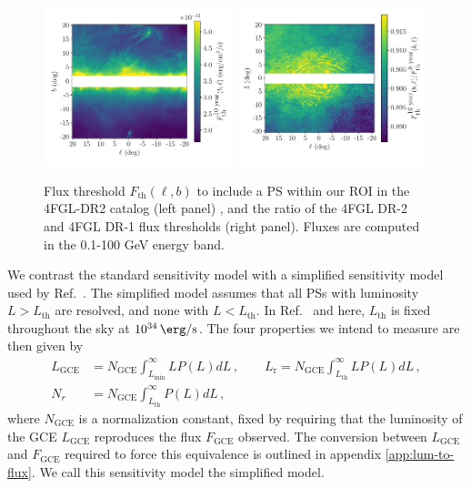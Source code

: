 \documentclass[letter,11pt]{article}
\begin{document}
\begin{figure}
    \centering
    \includegraphics[width=0.49\textwidth]{figs/sensitivity-map-10-year.pdf}
    \hfill
    \includegraphics[width=0.49\textwidth]{figs/sensitivity-map-quotient.pdf}
    \caption{Flux threshold $F_\text{th}(\ell, b)$ to include a PS within our ROI in the 4FGL-DR2 catalog (left panel) \cite{Fermi-LAT:2019yla, Ballet:2020hze}, and the ratio of the 4FGL DR-2 and 4FGL DR-1 flux thresholds (right panel). Fluxes are computed in the 0.1-100 GeV energy band.}
    \label{fig:sensitivity}
\end{figure}

We contrast the standard sensitivity model with a simplified sensitivity model used by Ref.~\cite{Zhong:2019ycb}. The simplified model assumes that all PSs with luminosity $L>L_\text{th}$ are resolved, and none with $L<L_{\text{th}}$. In Ref.~\cite{Zhong:2019ycb} and here, $L_\text{th}$ is fixed throughout the sky at $\SI{e34}{\erg\per\second}$. The four properties we intend to measure are then given by
\begin{equation}
    \begin{split}
        L_\text{GCE} &= N_\text{GCE}\int_{L_\text{min}}^\infty L P(L) dL \,, \qquad
        L_\text{r} = N_\text{GCE}\int_{L_\text{th}}^\infty L P(L) dL \,, \\
        N_r &= N_\text{GCE}\int_{L_\text{th}}^\infty P(L) dL \,,
        \label{eqn:observables-sens-1}
    \end{split}
\end{equation}
where $N_\text{GCE}$ is a normalization constant, fixed by requiring that the luminosity of the GCE $L_\text{GCE}$ reproduces the flux $F_\text{GCE}$ observed. The conversion between $L_\text{GCE}$ and $F_\text{GCE}$ required to force this equivalence is outlined in appendix \ref{app:lum-to-flux}. We call this sensitivity model the simplified model.
\end{document}
